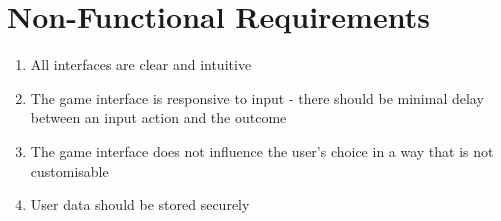 \section{Non-Functional Requirements}

\begin{enumerate}[label=\textbf{NR.\arabic*}]
    \item All interfaces are clear and intuitive
    \item The game interface is responsive to input - there should be minimal delay between an input action and the outcome
    \item The game interface does not influence the user's choice in a way that is not customisable
    \item User data should be stored securely
\end{enumerate}